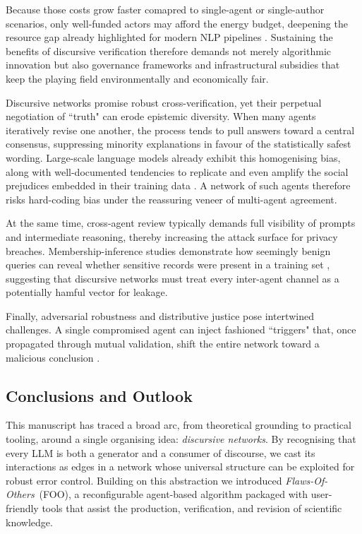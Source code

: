 \documentclass[12pt]{article}
\theoremstyle{definition}
\begin{document}
Because those costs grow faster comapred to single-agent or single-author scenarios, only well-funded actors may afford the energy
budget, deepening the resource gap already highlighted for modern NLP
pipelines \cite{Strubell2019Energy}.  Sustaining the benefits of
discursive verification therefore demands not merely algorithmic
innovation but also governance frameworks and infrastructural subsidies
that keep the playing field environmentally and economically fair.

Discursive networks promise robust cross-verification, yet their
perpetual negotiation of ``truth" can erode epistemic diversity.
When many agents iteratively revise one another, the process tends to
pull answers toward a central consensus, suppressing minority
explanations in favour of the statistically safest wording.
Large-scale language models already exhibit this homogenising bias,
along with well-documented tendencies to replicate and even amplify the
social prejudices embedded in their training data
\cite{Bender2021Parrots}.  A network of such agents therefore risks
hard-coding bias under the reassuring veneer of multi-agent agreement.

At the same time, cross-agent review
typically demands full visibility of prompts and intermediate
reasoning, thereby increasing the attack surface for privacy breaches.
Membership-inference studies demonstrate how seemingly benign queries
can reveal whether sensitive records were present in a training set
\cite{Shokri2017Membership}, suggesting that discursive networks must
treat every inter-agent channel as a potentially hamful vector for leakage.

Finally, adversarial robustness and distributive justice pose
intertwined challenges.  A single compromised agent can inject
fashioned ``triggers" that, once propagated through mutual validation,
shift the entire network toward a malicious conclusion
\cite{Wallace2019Triggers}.  

\subsection{Conclusions and Outlook}
\label{sec:conclusion}

This manuscript has traced a broad arc, from theoretical grounding to
practical tooling, around a single organising idea: \emph{discursive
networks}.  By recognising that every LLM is
both a generator and a consumer of discourse, we cast its interactions as
edges in a network whose universal structure can be exploited for
robust error control.   
Building on this abstraction we 
introduced \emph{Flaws-Of-Others}~(FOO), a reconfigurable
agent-based algorithm packaged with user-friendly tools that assist the
production, verification, and revision of scientific knowledge.  
\end{document}
